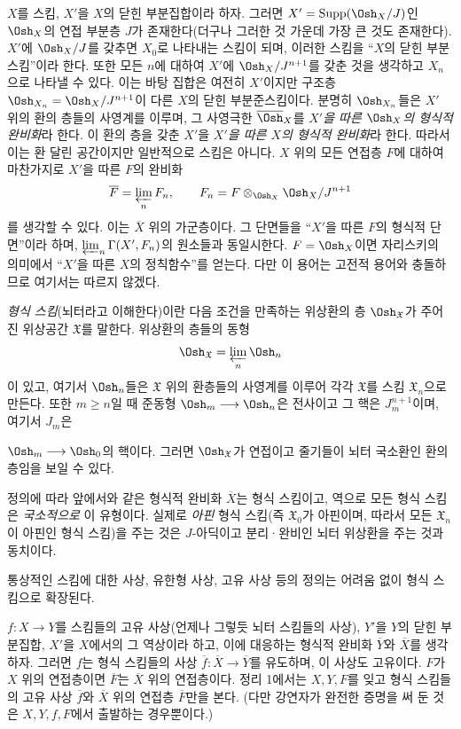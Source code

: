 $X$를 스킴, $X'$을 $X$의 닫힌 부분집합이라 하자. 그러면
$X'=\operatorname{Supp}(\Osh_X/J)$인 $\Osh_X$의 연접 부분층 $J$가
존재한다(더구나 그러한 것 가운데 가장 큰 것도 존재한다). $X'$에
$\Osh_X/J$를 갖추면 $X_0$로 나타내는 스킴이 되며, 이러한 스킴을
``$X$의 닫힌 부분스킴''이라 한다. 또한 모든 $n$에 대하여 $X'$에
$\Osh_X/J^{n+1}$를 갖춘 것을 생각하고 $X_n$으로 나타낼 수 있다. 이는
바탕 집합은 여전히 $X'$이지만 구조층
$\Osh_{X_n}=\Osh_X/J^{n+1}$이 다른 $X$의 닫힌 부분준스킴이다. 분명히
$\Osh_{X_n}$들은 $X'$ 위의 환의 층들의 사영계를 이루며, 그 사영극한
$\overline{\Osh}_X$를 \emph{$X'$을 따른 $\Osh_X$의 형식적 완비화}라
한다. 이 환의 층을 갖춘 $X'$을 \emph{$X'$을 따른 $X$의 형식적
완비화}라 한다. 따라서 이는 환 달린 공간이지만 일반적으로 스킴은 아니다.
$X$ 위의 모든 연접층 $F$에 대하여 마찬가지로 $X'$을 따른 $F$의 완비화
\[
\overline F=\varprojlim_n F_n,
\qquad F_n=F\otimes_{\Osh_X}\Osh_X/J^{n+1}
\]
를 생각할 수 있다. 이는 $\overline X$ 위의 가군층이다. 그 단면들을
``$X'$을 따른 $F$의 형식적 단면''이라 하며,
$\varprojlim_n\Gamma(X',F_n)$의 원소들과 동일시한다. $F=\Osh_X$이면
자리스키의 의미에서 ``$X'$을 따른 $X$의 정칙함수''를 얻는다. 다만 이
용어는 고전적 용어와 충돌하므로 여기서는 따르지 않겠다.

\emph{형식 스킴}(뇌터라고 이해한다)이란 다음 조건을 만족하는 위상환의 층
$\Osh_{\mathfrak X}$가 주어진 위상공간 $\mathfrak X$를 말한다. 위상환의
층들의 동형
\[
\Osh_{\mathfrak X}=\varprojlim_n\Osh_n
\]
이 있고, 여기서 $\Osh_n$들은 $\mathfrak X$ 위의 환층들의 사영계를
이루어 각각 $\mathfrak X$를 스킴 $\mathfrak X_n$으로 만든다. 또한
$m\geq n$일 때 준동형 $\Osh_m\longrightarrow\Osh_n$은 전사이고 그 핵은
$J_m^{n+1}$이며, 여기서 $J_m$은

$\Osh_m\longrightarrow\Osh_0$의 핵이다. 그러면 $\Osh_{\mathfrak X}$가
연접이고 줄기들이 뇌터 국소환인 환의 층임을 보일 수 있다.

정의에 따라 앞에서와 같은 형식적 완비화 $\overline X$는 형식 스킴이고,
역으로 모든 형식 스킴은 \emph{국소적으로} 이 유형이다. 실제로 \emph{아핀}
형식 스킴(즉 $\mathfrak X_0$가 아핀이며, 따라서 모든 $\mathfrak X_n$이
아핀인 형식 스킴)을 주는 것은 $J$-아딕이고 분리·완비인 뇌터 위상환을
주는 것과 동치이다.

통상적인 스킴에 대한 사상, 유한형 사상, 고유 사상 등의 정의는 어려움
없이 형식 스킴으로 확장된다.


$f:X\longrightarrow Y$를 스킴들의 고유 사상(언제나 그렇듯 뇌터
스킴들의 사상), $Y'$을 $Y$의 닫힌 부분집합, $X'$을 $X$에서의 그
역상이라 하고, 이에 대응하는 형식적 완비화 $\overline Y$와
$\overline X$를 생각하자. 그러면 $f$는 형식 스킴들의 사상
$\overline f:\overline X\longrightarrow\overline Y$를 유도하며, 이
사상도 고유이다. $F$가 $X$ 위의 연접층이면 $\overline F$는
$\overline X$ 위의 연접층이다. 정리 1에서는 $X,Y,F$를 잊고 형식
스킴들의 고유 사상 $\overline f$와 $\overline X$ 위의 연접층
$\overline F$만을 본다. (다만 강연자가 완전한 증명을 써 둔 것은
$X,Y,f,F$에서 출발하는 경우뿐이다.)

